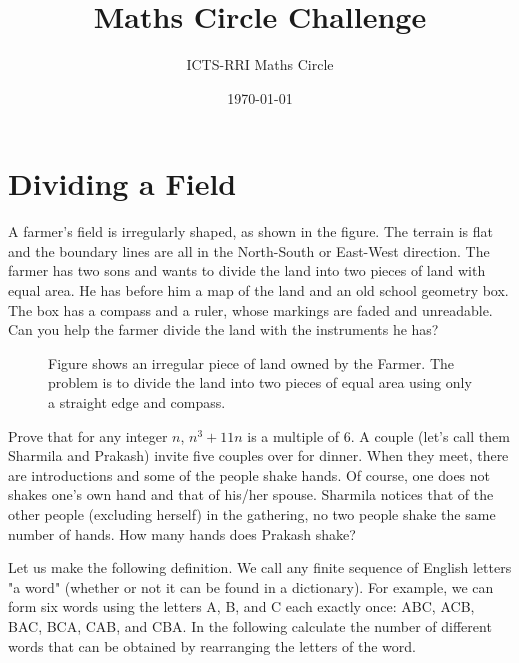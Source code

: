 \documentclass[12pt]{exam}
\date{\today}
\begin{document}
\title{Maths Circle Challenge}
\author{ICTS-RRI Maths Circle}
\maketitle
\thispagestyle{empty}
\section*{Dividing a Field}

\begin{questions}
\question A farmer's field is irregularly shaped, as shown in the figure. The terrain is flat and the boundary lines are all in the North-South or East-West direction. The farmer has two sons and wants to divide the land into two pieces of land with equal area. He has before him a map of the land and an old school geometry box. The box has a compass and a ruler, whose markings are faded and unreadable. Can you help the farmer divide the land with the instruments he has?
\begin{figure}[h]
    \centering
    \caption{Figure shows an irregular piece of land owned by the Farmer. The problem is to divide the land into two pieces of equal area using only a straight edge and compass.}
\end{figure}

\question Prove that for any integer $n$, $n^3+11n$ is a multiple of 6.
\question A couple (let's call them Sharmila and Prakash) invite five couples over for dinner. When they meet, there are introductions and some of the people shake hands. Of course, one does not shakes one's own hand and that of his/her spouse. Sharmila notices that of the other people (excluding herself) in the gathering, no two people shake the same number of hands. How many hands does Prakash shake?

\question Let us make the following definition. We call any finite sequence of English letters "a word" (whether or not it can be found in a dictionary). For example, we can form six words using the letters A, B, and C each exactly once: ABC, ACB, BAC, BCA, CAB, and CBA. In the following calculate the number of different words that can be obtained by rearranging the letters of the word.
\begin{parts}

\end{parts}
\end{questions}
\end{document}
